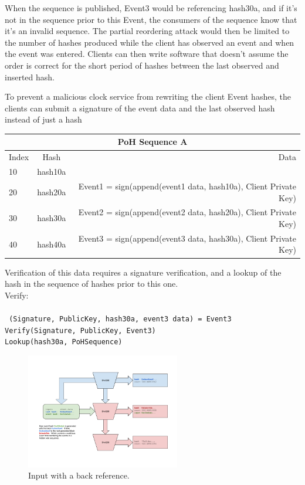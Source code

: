 \documentclass[12pt]{article}
\begin{document}
When the sequence is published, Event3 would be referencing hash30a, and if it’s not in the sequence prior to this Event, the consumers of the sequence know that it’s an invalid sequence. The partial reordering attack would then be limited to the number of hashes produced while the client has observed an event and when the event was entered. Clients can then write software that doesn’t assume the order is correct for the short period of hashes between the last observed and inserted hash.

To prevent a malicious clock service from rewriting the client Event hashes, the clients can submit a signature of the event data and the last observed hash instead of just a hash\\
\begin{center}
  \begin{tabular}{ | l | c | r |}
    \hline
    \multicolumn{3}{|c|}{PoH Sequence A} \\
    \hline
    Index & Hash & Data \\ \hline
    10 & hash10a & \\ \hline
    20 & hash20a & Event1 = sign(append(event1 data, hash10a), Client Private Key) \\ \hline
    30 & hash30a & Event2 = sign(append(event2 data, hash20a), Client Private Key) \\ \hline
    40 & hash40a & Event3 = sign(append(event3 data, hash30a), Client Private Key) \\
    \hline
    \end{tabular}
\end{center}

Verification of this data requires a signature verification, and a lookup of the hash in the sequence of hashes prior to this one.\\
\noindent Verify:\\\\\noindent
\texttt{
    (Signature, PublicKey, hash30a, event3 data) = Event3 \\
    Verify(Signature, PublicKey, Event3)\\
    Lookup(hash30a, PoHSequence)
}

\begin{figure}
  \begin{center}
    \centering
    \includegraphics[width=0.6\textwidth]{figures/fig_6.png}
    \caption[Fig 6]{Input with a back reference.\label{fig:poh_consistency}}
  \end{center}
  \end{figure}
\end{document}
